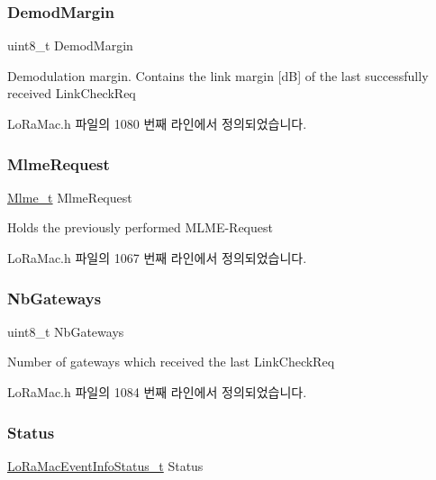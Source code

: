 \subsubsection{\texorpdfstring{Demod\+Margin}{DemodMargin}}
{\footnotesize\ttfamily uint8\+\_\+t Demod\+Margin}

Demodulation margin. Contains the link margin \mbox{[}dB\mbox{]} of the last successfully received Link\+Check\+Req 

Lo\+Ra\+Mac.\+h 파일의 1080 번째 라인에서 정의되었습니다.

\mbox{\label{structs_mlme_confirm_a05e619573c522884eada37bde4e3d1f3}} 
\subsubsection{\texorpdfstring{Mlme\+Request}{MlmeRequest}}
{\footnotesize\ttfamily \mbox{\hyperlink{group___l_o_r_a_m_a_c_ga663544b83d50ec3518608be495896809}{Mlme\+\_\+t}} Mlme\+Request}

Holds the previously performed M\+L\+M\+E-\/\+Request 

Lo\+Ra\+Mac.\+h 파일의 1067 번째 라인에서 정의되었습니다.

\mbox{\label{structs_mlme_confirm_ac2fbb4be8e3cc46943038a1796010d71}} 
\subsubsection{\texorpdfstring{Nb\+Gateways}{NbGateways}}
{\footnotesize\ttfamily uint8\+\_\+t Nb\+Gateways}

Number of gateways which received the last Link\+Check\+Req 

Lo\+Ra\+Mac.\+h 파일의 1084 번째 라인에서 정의되었습니다.

\mbox{\label{structs_mlme_confirm_ab360e499d5a7a9e0aa7b4df7239633b5}} 
\subsubsection{\texorpdfstring{Status}{Status}}
{\footnotesize\ttfamily \mbox{\hyperlink{group___l_o_r_a_m_a_c_gac6ffc346a4c767f7a743c87a686c51b4}{Lo\+Ra\+Mac\+Event\+Info\+Status\+\_\+t}} Status}


